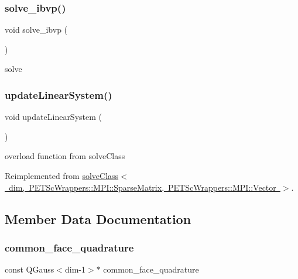 \subsubsection{\texorpdfstring{solve\_ibvp()}{solve\_ibvp()}}
{\footnotesize\ttfamily void solve\+\_\+ibvp (\begin{DoxyParamCaption}{ }\end{DoxyParamCaption})\hspace{0.3cm}{\ttfamily [virtual]}}

solve \mbox{\label{classmechano_chem_f_e_m_af78c2c6284234c93872188334fb997d8}} 
\subsubsection{\texorpdfstring{updateLinearSystem()}{updateLinearSystem()}}
{\footnotesize\ttfamily void update\+Linear\+System (\begin{DoxyParamCaption}{ }\end{DoxyParamCaption})\hspace{0.3cm}{\ttfamily [virtual]}}

overload function from solve\+Class 

Reimplemented from \mbox{\hyperlink{classsolve_class_af78c2c6284234c93872188334fb997d8}{solve\+Class$<$ dim, P\+E\+T\+Sc\+Wrappers\+::\+M\+P\+I\+::\+Sparse\+Matrix, P\+E\+T\+Sc\+Wrappers\+::\+M\+P\+I\+::\+Vector $>$}}.



\subsection{Member Data Documentation}
\mbox{\label{classmechano_chem_f_e_m_af302403bba9078de92d05b4cbe6f44dd}} 
\subsubsection{\texorpdfstring{common\_face\_quadrature}{common\_face\_quadrature}}
{\footnotesize\ttfamily const Q\+Gauss$<$dim-\/1$>$$\ast$ common\+\_\+face\+\_\+quadrature}

\mbox{\label{classmechano_chem_f_e_m_ae2063c17722c7eae9e91a4ad6b353b34}} 

